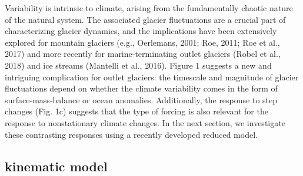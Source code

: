 \documentclass[tc, manuscript]{copernicus}
\begin{document}
Variability is intrinsic to climate, arising from the fundamentally chaotic nature of the natural system. The associated glacier fluctuations are a crucial part of characterizing glacier dynamics, and the implications have been extensively explored for mountain glaciers (e.g., Oerlemans, 2001; Roe, 2011; Roe et al., 2017) and more recently for marine-terminating outlet glaciers (Robel et al., 2018) and ice streams (Mantelli et al., 2016). Figure 1 suggests a new and intriguing complication for outlet glaciers: the timescale and magnitude of glacier fluctuations depend on whether the climate variability comes in the form of surface-mass-balance or ocean anomalies. Additionally, the response to step changes (Fig. 1c) suggests that the type of forcing is also relevant for the response to nonstationary climate changes. In the next section, we investigate these contrasting responses using a recently developed reduced model.

\subsection{kinematic model}
\end{document}
